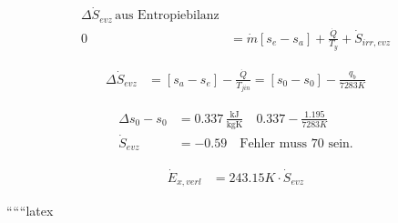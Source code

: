 \begin{align*}
\Delta \dot{S}_{evz} \, \text{aus Entropiebilanz} \\
0 &= \dot{m} [s_e - s_a] + \frac{\dot{Q}}{T_y} + \dot{S}_{irr, evz}
\end{align*}

\begin{align*}
\Delta \dot{S}_{evz} &= [s_a - s_e] - \frac{\dot{Q}}{T_{jin}} = [s_0 - s_0] - \frac{q_b}{7283K}
\end{align*}

\begin{align*}
\Delta s_0 - s_0 &= 0.337 \, \frac{\text{kJ}}{\text{kgK}} \quad 0.337 - \frac{1.195}{7283K} \\
\dot{S}_{evz} &= -0.59 \quad \text{Fehler muss 70 sein.}
\end{align*}

\begin{align*}
\dot{E}_{x, verl} &= 243.15K \cdot \dot{S}_{evz}
\end{align*}

``````latex


